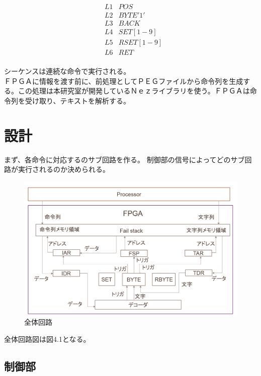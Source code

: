 \documentclass[12pt,oneside]{report}
\begin{document}
\begin{eqnarray}\nonumber
&L1& POS\\\nonumber
&L2& BYTE '1'\\\nonumber
&L3& BACK\\\nonumber
&L4& SET [1-9]\\\nonumber
&L5& RSET [1-9]\\\nonumber
&L6& RET\\\nonumber
\end{eqnarray}

シーケンスは連続な命令で実行される。\\


ＦＰＧＡに情報を渡す前に、前処理としてＰＥＧファイルから命令列を生成する。この処理は本研究室が開発しているＮｅｚライブラリを使う。ＦＰＧＡは命令列を受け取り、テキストを解析する。


\chapter{設計}
\label{Design}
まず、各命令に対応するのサブ回路を作る。
制御部の信号によってどのサブ回路が実行されるのか決められる。

\begin{figure}[t]
    \begin{center}
        \includegraphics[width=130mm]{./fig/overall_circuit.png}
       \caption{全体回路}
        \label{fig:overall_circuit}
    \end{center}
\end{figure}

全体回路図は図4.1となる。


\section{制御部}
\end{document}
